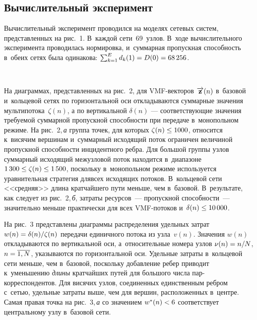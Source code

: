 \begin{multicols}{2}
\vspace*{-14pt}

\section{Вычислительный эксперимент }

\vspace*{-2pt}

Вычислительный эксперимент проводился на моделях сетевых систем, представленных 
на рис.~1. В~каждой сети~69~узлов. В~ходе вычислительного эксперимента 
проводилась нормировка, и~суммарная пропускная способность в~обеих сетях была 
одинакова:
$\sum\nolimits_{k=1}^{E} d_k(1)\hm = D(0)\hm= 68\,256$.



\begin{figure*} %
\vspace*{1pt}
      \begin{center}
     \mbox{%
\epsfxsize=163mm 
}
\end{center}
\vspace*{-9pt}
\end{figure*}

На диаграммах, представленных на рис.~2, для  VMF-век\-то\-ров 
$\overrightarrow{\mathbf{z}}(n)$ в~базовой и~кольцевой сетях по горизонтальной оси 
откладываются суммарные значения мультипотока~$\zeta(n)$, а по вертикальной  
$\delta(n)$ --- со\-от\-вет\-ст\-ву\-ющие значения требуемой  суммарной пропускной 
способности при передаче  в~монопольном режиме. На рис.~2,\,\textit{а} группа точек, для 
которых $\zeta(n)\hm\le 1000$, относится к~висячим вершинам и~суммарный исходящий 
поток ограничен величиной пропускной способности инцидентного ребра. Для большой 
группы узлов суммарный исходящий межузловой поток находится в~диапазоне  $1\,300\hm\le \zeta(n)\hm\le 1\,500$, поскольку в~монопольном режиме используется 
уравнительная стратегия для\linebreak всех исходящих потоков.
В~кольцевой сети <<средняя>> длина кратчайшего пути меньше, чем в~базовой. В~результате, как следует из рис.~2,\,\textit{б}, 
\mbox{затраты} ресурсов~--- пропускной способности~--- 
значительно меньше практически для всех VMF-по\-то\-ков и~$\delta(n) \hm\le 10\,000$.

На рис.~3 представлены диаграммы  распределения удельных затрат $w(n) \hm= 
\delta(n)/\zeta(n)$ передачи единичного потока из узла~$v(n)$.
Значения $w(n)$ откладываются по вертикальной оси, а~относительные номера узлов 
$\nu(n)\hm = n/N$, $n = \overline{1, N}$,  указываются по горизонтальной оси. Удельные 
затраты в~кольцевой сети меньше, чем в~базовой, поскольку добавление ребер 
приводит к~уменьшению \textit{длины} кратчайших путей для большого чис\-ла пар-кор\-рес\-пон\-ден\-тов. Для висячих узлов, соединенных единственным реб\-ром с~сетью, 
удельные затраты выше,
чем для вершин, расположенных в~центре. Самая
правая 
точка на рис.~3,\,\textit{а} со значением $w^*(n)\hm< 6$ соответствует центральному узлу в~базовой сети. 


\end{multicols}
